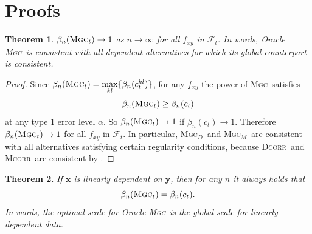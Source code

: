 \documentclass[11pt]{article}
\providecommand{\sct}[1]{{\normalfont\textsc{#1}}}
\providecommand{\mb}[1]{\boldsymbol{#1}}
\providecommand{\mc}[1]{\mathcal{#1}}
\newcommand{\G}{c}
\newcommand{\Mgc}{\sct{Mgc}}
\newcommand{\Mgcd}{\sct{Mgc$_D$}}
\newcommand{\Mgcm}{\sct{Mgc$_M$}}
\newcommand{\Dcorr}{\sct{Dcorr}}
\newcommand{\Mcorr}{\sct{Mcorr}}
\newtheorem{appThm}{Theorem}
\begin{document}
\section{Proofs}
\label{appen:proofs}
\begin{appThm}
$\beta_n(\Mgc_t) \rightarrow 1$ as $n \to \infty$ for all $f_{xy}$ in $\mc{F}_t$.
In words, Oracle \Mgc~is consistent with all dependent alternatives for which its global counterpart is consistent. 
\end{appThm}
\begin{proof}
Since $\beta_n(\Mgc_t)=\underset{kl}{\max}\{\beta_n(\G_t^{kl})\}$, for any $f_{xy}$ the power of \Mgc~satisfies
\begin{equation*}
\beta_n(\Mgc_t) \geq \beta_n(\G_t)
\end{equation*}
at any type $1$ error level $\alpha$. So $\beta_n(\Mgc_t) \rightarrow 1$ if $\beta_n(\G_t) \rightarrow 1$.
% 
Therefore $\beta_n(\Mgc_t) \rightarrow 1$ for all $f_{xy}$ in $\mc{F}_t$. In particular, \Mgcd~and \Mgcm~are consistent with all alternatives satisfying certain regularity conditions, because \Dcorr~and \Mcorr~are consistent by \cite{SzekelyRizzoBakirov2007, SzekelyRizzo2013a}. 
\end{proof}

\begin{appThm}
If $\mb{x}$ is linearly dependent on $\mb{y}$, then for any $n$ it always holds that
\begin{equation}
\beta_n(\Mgc_t) = \beta_n(\G_t).
\end{equation}
In words, the optimal scale for Oracle \Mgc~is the global scale for linearly dependent data.
\end{appThm}
\end{document}
